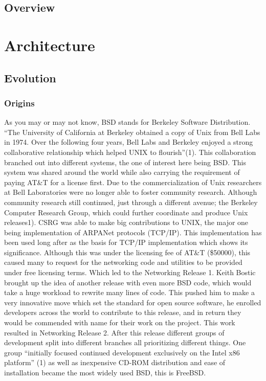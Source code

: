 \documentclass[12pt, dvipsnames, a4paper]{article}
\begin{document}
\subsection{Overview}
\lipsum[1]
\clearpage
\section{Architecture}
\subsection{Evolution}
\subsubsection{Origins}
As you may or may not know, BSD stands for Berkeley Software Distribution. “The University of California at Berkeley obtained a copy of Unix from Bell Labs in 1974. Over the following four years, Bell Labs and Berkeley enjoyed a strong collaborative relationship which helped UNIX to flourish”(1). This collaboration branched out into different systems, the one of interest here being BSD. This system was shared around the world while also carrying the requirement of paying AT\&T for a license first. Due to the commercialization of Unix researchers at Bell Laboratories were no longer able to foster community research. Although community research still continued, just through a different avenue; the Berkeley Computer Research Group, which could further coordinate and produce Unix releases1).
CSRG was able to make big contributions to UNIX, the major one being implementation of ARPANet protocols (TCP/IP). This implementation has been used long after as the basis for TCP/IP implementation which shows its significance.
Although this was under the licensing fee of AT\&T (\$50000), this caused many to request for the networking code and utilities to be provided under free licensing terms. Which led to the Networking Release 1. Keith Bostic brought up the idea of another release with even more BSD code, which would take a huge workload to rewrite many lines of code. This pushed him to make a very innovative move which set the standard for open source software, he enrolled developers across the world to contribute to this release, and in return they would be commended with name for their work on the project. This work resulted in Networking Release 2.
After this release different groups of development split into different branches all prioritizing different things. One group “initially focused continued development exclusively on the Intel x86 platform” (1) as well as inexpensive CD-ROM distribution and ease of installation became the most widely used BSD, this is FreeBSD.
\end{document}
